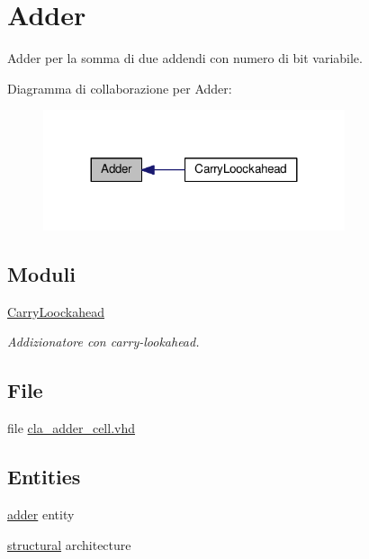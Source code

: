 \hypertarget{group___adder}{\section{Adder}
\label{group___adder}
}


Adder per la somma di due addendi con numero di bit variabile.  


Diagramma di collaborazione per Adder\+:\nopagebreak
\begin{figure}[H]
\begin{center}
\leavevmode
\includegraphics[width=251pt]{group___adder}
\end{center}
\end{figure}
\subsection*{Moduli}
\begin{DoxyCompactItemize}
\item 
\hyperlink{group___carry_loockahead}{Carry\+Loockahead}
\begin{DoxyCompactList}\small\item\em Addizionatore con carry-\/lookahead. \end{DoxyCompactList}\end{DoxyCompactItemize}
\subsection*{File}
\begin{DoxyCompactItemize}
\item 
file \hyperlink{cla__adder__cell_8vhd}{cla\+\_\+adder\+\_\+cell.\+vhd}
\end{DoxyCompactItemize}
\subsection*{Entities}
\begin{DoxyCompactItemize}
\item 
\hyperlink{classadder}{adder} entity
\item 
\hyperlink{classadder_1_1structural}{structural} architecture
\end{DoxyCompactItemize}
